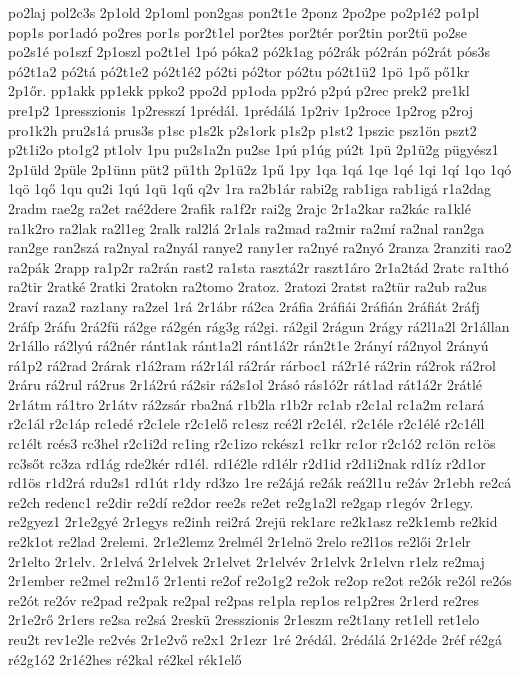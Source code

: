 {po2laj
pol2c3s
2p1old
2p1oml
pon2gas
pon2t1e
2ponz
2po2pe
po2p1é2
po1pl
pop1s
por1adó
po2res
por1s
por2t1el
por2tes
por2tér
por2tin
por2tü
po2se
po2s1é
po1szf
2p1oszl
po2t1el
1pó
póka2
pó2k1ag
pó2rák
pó2rán
pó2rát
pós3s
pó2t1a2
pó2tá
pó2t1e2
pó2t1é2
pó2ti
pó2tor
pó2tu
pó2t1ü2
1pö
1pő
pő1kr
2p1őr.
pp1akk
pp1ekk
ppko2
ppo2d
pp1oda
pp2ró
p2pú
p2rec
prek2
pre1kl
pre1p2
1presszionis
1p2resszí
1prédál.
1prédálá
1p2riv
1p2roce
1p2rog
p2roj
pro1k2h
pru2s1á
prus3s
p1sc
p1s2k
p2s1ork
p1s2p
p1st2
1pszic
psz1ön
pszt2
p2t1i2o
pto1g2
pt1olv
1pu
pu2s1a2n
pu2se
1pú
p1úg
pú2t
1pü
2p1ü2g
pügyész1
2p1üld
2püle
2p1ünn
püt2
pü1th
2p1ü2z
1pű
1py
1qa
1qá
1qe
1qé
1qi
1qí
1qo
1qó
1qö
1qő
1qu
qu2i
1qú
1qü
1qű
q2v
1ra
ra2b1ár
rabi2g
rab1iga
rab1igá
r1a2dag
2radm
rae2g
ra2et
raé2dere
2rafik
ra1f2r
rai2g
2rajc
2r1a2kar
ra2kác
ra1klé
ra1k2ro
ra2lak
ra2l1eg
2ralk
ral2lá
2r1als
ra2mad
ra2mir
ra2mí
ra2nal
ran2ga
ran2ge
ran2szá
ra2nyal
ra2nyál
ranye2
rany1er
ra2nyé
ra2nyó
2ranza
2ranziti
rao2
ra2pák
2rapp
ra1p2r
ra2rán
rast2
ra1sta
rasztá2r
raszt1áro
2r1a2tád
2ratc
ra1thó
ra2tir
2ratké
2ratki
2ratokn
ra2tomo
2ratoz.
2ratozi
2ratst
ra2tür
ra2ub
ra2us
2raví
raza2
raz1any
ra2zel
1rá
2r1ábr
rá2ca
2ráfia
2ráfiái
2ráfián
2ráfiát
2ráfj
2ráfp
2ráfu
2rá2fü
rá2ge
rá2gén
rág3g
rá2gi.
rá2gil
2rágun
2rágy
rá2l1a2l
2r1állan
2r1állo
rá2lyú
rá2nér
ránt1ak
ránt1a2l
ránt1á2r
rán2t1e
2rányí
rá2nyol
2rányú
rá1p2
rá2rad
2rárak
r1á2ram
rá2r1ál
rá2rár
rárboc1
rá2r1é
rá2rin
rá2rok
rá2rol
2ráru
rá2rul
rá2rus
2r1á2rú
rá2sir
rá2s1ol
2rásó
rás1ó2r
rát1ad
rát1á2r
2rátlé
2r1átm
rá1tro
2r1átv
rá2zsár
rba2ná
r1b2la
r1b2r
rc1ab
r2c1al
rc1a2m
rc1ará
r2c1ál
r2c1áp
rc1edé
r2c1ele
r2c1elő
rc1esz
rcé2l
r2c1él.
r2c1éle
r2c1élé
r2c1éll
rc1élt
rcés3
rc3hel
r2c1i2d
rc1ing
r2c1izo
rckész1
rc1kr
rc1or
r2c1ó2
rc1ön
rc1ös
rc3sőt
rc3za
rd1ág
rde2kér
rd1él.
rd1é2le
rd1élr
r2d1id
r2d1i2nak
rd1íz
r2d1or
rd1ös
r1d2rá
rdu2s1
rd1út
r1dy
rd3zo
1re
re2ájá
re2ák
reá2l1u
re2áv
2r1ebh
re2cá
re2ch
redenc1
re2dir
re2dí
re2dor
ree2s
re2et
re2g1a2l
re2gap
r1egóv
2r1egy.
re2gyez1
2r1e2gyé
2r1egys
re2inh
rei2rá
2rejü
rek1arc
re2k1asz
re2k1emb
re2kid
re2k1ot
re2lad
2relemi.
2r1e2lemz
2relmél
2r1elnö
2relo
re2l1os
re2lői
2r1elr
2r1elto
2r1elv.
2r1elvá
2r1elvek
2r1elvet
2r1elvév
2r1elvk
2r1elvn
r1elz
re2maj
2r1ember
re2mel
re2m1ő
2r1enti
re2of
re2o1g2
re2ok
re2op
re2ot
re2ók
re2ól
re2ós
re2ót
re2óv
re2pad
re2pak
re2pal
re2pas
re1pla
rep1os
re1p2res
2r1erd
re2res
2r1e2rő
2r1ers
re2sa
re2sá
2reskü
2resszionis
2r1eszm
re2t1any
ret1ell
ret1elo
reu2t
rev1e2le
re2vés
2r1e2vő
re2x1
2r1ezr
1ré
2rédál.
2rédálá
2r1é2de
2réf
ré2gá
ré2g1ó2
2r1é2hes
ré2kal
ré2kel
rék1elő
}
